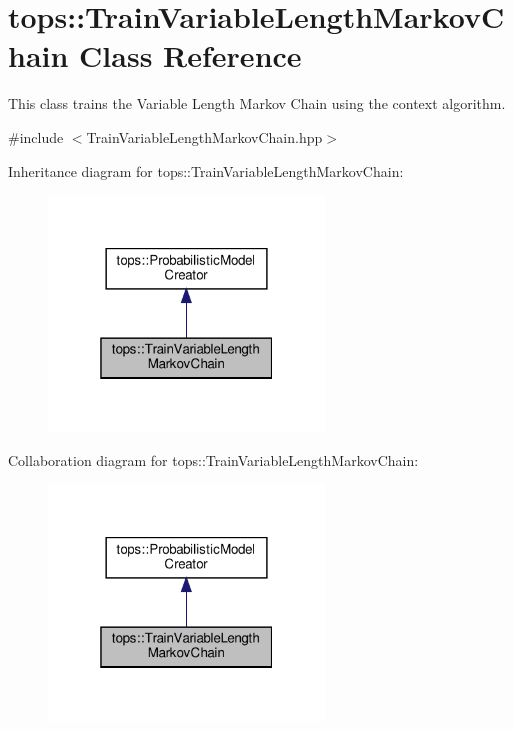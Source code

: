 \hypertarget{classtops_1_1TrainVariableLengthMarkovChain}{}\section{tops\+:\+:Train\+Variable\+Length\+Markov\+Chain Class Reference}
\label{classtops_1_1TrainVariableLengthMarkovChain}


This class trains the Variable Length Markov Chain using the context algorithm.  




{\ttfamily \#include $<$Train\+Variable\+Length\+Markov\+Chain.\+hpp$>$}



Inheritance diagram for tops\+:\+:Train\+Variable\+Length\+Markov\+Chain\+:
\nopagebreak
\begin{figure}[H]
\begin{center}
\leavevmode
\includegraphics[width=208pt]{classtops_1_1TrainVariableLengthMarkovChain__inherit__graph}
\end{center}
\end{figure}


Collaboration diagram for tops\+:\+:Train\+Variable\+Length\+Markov\+Chain\+:
\nopagebreak
\begin{figure}[H]
\begin{center}
\leavevmode
\includegraphics[width=208pt]{classtops_1_1TrainVariableLengthMarkovChain__coll__graph}
\end{center}
\end{figure}
